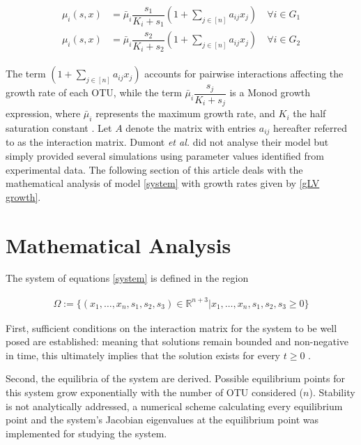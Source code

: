 \documentclass[processes,article,submit,moreauthors,pdftex]{Definitions/mdpi}
\newcommand{\R}{\mathbb{R}}
\begin{document}
\begin{align}
\label{gLV growth} \begin{array}{lc}
\mu_i(s,x) &= \bar{\mu}_i \dfrac{s_1}{K_i + s_1}\left(1+\sum \limits_{j\in [n]} a_{ij} x_{j} \right) \quad \forall i \in G_1 \\
\mu_i(s,x) &= \bar{\mu}_i \dfrac{s_2}{K_i + s_2}\left(1+\sum \limits_{j\in [n]} a_{ij} x_{j} \right) \quad \forall i \in G_2
\end{array}  
\end{align}

The term $\left(1+\sum \limits_{j\in [n]} a_{ij} x_{j} \right)$ accounts for pairwise interactions affecting the growth rate of each OTU, while the term $\bar{\mu}_i\dfrac{s_j}{K_i + s_j}$ is a Monod growth expression, where $\bar{\mu}_i$ represents the maximum growth rate, and $K_i$ the half saturation constant \cite{monod1942recherches}. Let $A$ denote the matrix
with entries $a_{ij}$ hereafter referred to as the interaction matrix. Dumont\textit{ et al.} did not analyse their model but simply provided several simulations using parameter values identified from experimental data. The following section of this article deals with the mathematical analysis of model \eqref{system} with growth rates given by \eqref{gLV growth}.

\section{Mathematical Analysis}

The system of equations \eqref{system} is defined in the region 

\begin{align*}
\Omega := \{ (x_1,\dots,x_n,s_1,s_2,s_3)\in  \R^{n+3} | x_1,\dots,x_n,s_1,s_2,s_3  \geq 0  \}
\end{align*}

First, sufficient conditions on the interaction matrix for the system to be well posed are established: meaning that solutions remain bounded and non-negative in time, this ultimately implies that the solution exists for every $t \geq 0$ \cite{Khalil1996}. 

Second, the equilibria of the system are derived. Possible equilibrium points for this system grow exponentially with the number of OTU considered ($n$).  Stability is not analytically addressed, a numerical scheme calculating every equilibrium point and the system's Jacobian eigenvalues at the equilibrium point was implemented for studying the system. 
\end{document}
